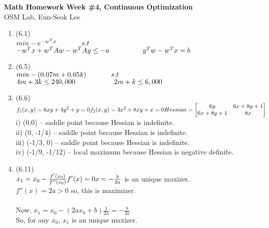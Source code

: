 \documentclass[letterpaper,12pt]{article}
\theoremstyle{definition}
\begin{document}
\begin{flushleft}
   \textbf{\large{Math Homework Week \#4, Continuous Optimization}} \\[5pt]
   OSM Lab, Eun-Seok Lee \\[5pt]

\end{flushleft}

\vspace{5mm}

\begin{enumerate}



	\item (6.1) \\
$min -e^{-w^Tx} \\
\phantom{----}s.t$ $-w^Tx +  w^TAw -w^TAy \leq  - a\\
\phantom{-----}y^Tw - w^Tx  = b$


	\item (6.5) \\
$min -(0.07m + 0.05k) \\
\phantom{----}s.t$ $4m + 3k \leq 240,000\\
\phantom{------}2m + k \leq 6,000$

	\item (6.6) \\
$f_1(x,y) = 6xy + 4y^2 + y = 0\\
f_2(x, y) = 3x^2 + 8xy + x = 0\\  \\
Hessian =  \begin{bmatrix} 6y& 6x+8y+1 \\ 6x+8y+1& 8x \end{bmatrix}\\$
i) (0,0) -- saddle point because Hessian is indefinite.\\
ii) (0, -1/4) -- saddle point because Hessian is indefinite.\\
iii) (-1/3, 0) -- saddle point because Hessian is indefinite.\\
iv) (-1/9, -1/12) -- local maximum because Hessian is negative definite.\\


	\item (6.11) \\
$ x_1 = x_0 - \frac{f'(x_0)}{f''(x_0)}\\
f'(x) = 0\\
x = -\frac{b}{2a} $ is an unique maxizer. \\
$f''(x) = 2a > 0$ so, this is maximizer. \\
\\
Now, $x_1 = x_0 - (2ax_0 +b)\frac{1}{2a} = -\frac{b}{2a}$ \\
So, for any $x_0$, $x_1$ is an unique maxizer.
 



\end{enumerate}
\end{document}
